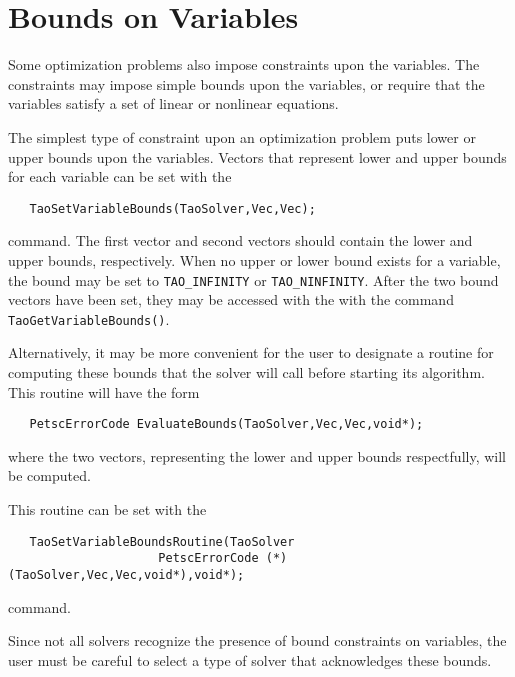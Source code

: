 \section{Bounds on Variables}\label{sec:bounds}

Some optimization problems also impose constraints upon the variables.
The constraints may impose simple bounds upon the variables, or
require that the variables satisfy a set of linear or  nonlinear equations.

The simplest type of constraint upon an optimization problem puts lower
or upper bounds upon the variables. 
Vectors that represent lower and upper bounds for each variable 
can be set with the   
\begin{verbatim}
   TaoSetVariableBounds(TaoSolver,Vec,Vec);
\end{verbatim}
command. 
The first vector and second vectors should contain the lower and upper 
bounds, respectively.
When no upper or lower bound exists for a variable, the bound
may be set to {\tt TAO\_INFINITY} or {\tt TAO\_NINFINITY}.
After the two bound vectors have been set, they may be accessed with the
with the command  {\tt TaoGetVariableBounds()}.

Alternatively, it may be more convenient for the user to designate a routine 
for computing these bounds
that the solver will call before starting its algorithm.  This routine will
have the form
\begin{verbatim}
   PetscErrorCode EvaluateBounds(TaoSolver,Vec,Vec,void*);
\end{verbatim}
where the two vectors, representing the lower and upper bounds respectfully, 
will be computed.

This routine can be set with the 
\begin{verbatim}
   TaoSetVariableBoundsRoutine(TaoSolver
                     PetscErrorCode (*)(TaoSolver,Vec,Vec,void*),void*);
\end{verbatim}
command.
   
Since not all solvers recognize the presence of bound constraints on 
variables, the user must be careful 
to select a type of solver that acknowledges these bounds.

